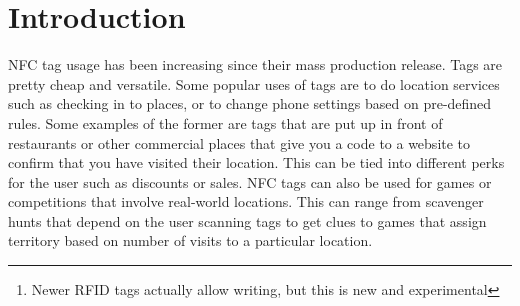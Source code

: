 \documentclass{sig-alternate}
\begin{document}
\maketitle
\begin{abstract}

Near Field Communication technology, or NFC as it is commonly called,
is a wireless radio communication standard that can be used to
exchange information between a device and a tag at close range. It is
a lot like RFID, but where RFID tags can be scanned at a distance of
meters, NFC tags need to be scanned at a distance of centimeters. The
upshot of this is that NFC allows two-way communication as opposed to
RFID tags that generally only support reading from the
tag\footnote{Newer RFID tags actually allow writing, but this is new
  and experimental}.

In this paper we explore the possibility of adding a security protocol
to NFC tags to allow secure location confirmation. For example, if a
restaurant wants to make sure that only people that have been to it
can submit reviews, it can place an NFC tag at the entrance/exit and
confirm that customers have scanned the tag before they are allowed to
submit a review online. We explore several different tag-device setups
under several attack scenarios. We show that it is possible to develop
a secure protocol with an on-phone TPM and a dumb tag that does not do
computation. If we relax the TPM requirement, we can have a ``good
enough'' solution that relies on the fact that only a certain fraction
of users are malicious.
\end{abstract}




\section{Introduction}
NFC tag usage has been increasing since their mass production
release. Tags are pretty cheap and versatile. Some popular uses of
tags are to do location services such as checking in to places, or to
change phone settings based on pre-defined rules. Some examples of the
former are tags that are put up in front of restaurants or other
commercial places that give you a code to a website to confirm that
you have visited their location. This can be tied into different perks
for the user such as discounts or sales. NFC tags can also be used for
games or competitions that involve real-world locations. This can
range from scavenger hunts that depend on the user scanning tags to
get clues to games that assign territory based on number of visits to
a particular location.
\end{document}
